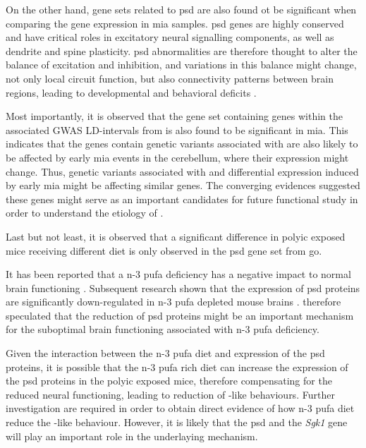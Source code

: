 On the other hand, gene sets related to \gls{psd} are also found ot be significant when comparing the gene expression in \gls{mia} samples. 
\gls{psd} genes are highly conserved and have critical roles in excitatory neural signalling components, as well as dendrite and spine plasticity.
\gls{psd} abnormalities are therefore thought to alter the balance of excitation and inhibition, and variations in this balance might change, not only local circuit function, but also connectivity patterns between brain regions, leading to developmental and behavioral deficits \citep{Cline2005}.

Most importantly, it is observed that the gene set containing genes within the associated \gls{GWAS} LD-intervals from \citet{Purcell2014} is also found to be significant in \gls{mia}.
This indicates that the genes contain genetic variants associated with  are also likely to be affected by early \gls{mia} events in the cerebellum, where their expression might change. 
Thus, genetic variants associated with  and differential expression induced by early \gls{mia} might be affecting similar genes.
The converging evidences suggested these genes might serve as an important candidates for future functional study in order to understand the etiology of .

Last but not least, it is observed that a significant difference in \gls{polyic} exposed mice receiving different diet is only observed in the \gls{psd} gene set from \gls{go}.

It has been reported that a n-3 \gls{pufa} deficiency has a negative impact to normal brain functioning \citep{Bazinet2014,Calon2005}.
Subsequent research shown that the expression of \gls{psd} proteins are significantly down-regulated in n-3 \gls{pufa} depleted mouse brains \citep{Sidhu2011}.
\citet{Sidhu2011} therefore speculated that the reduction of \gls{psd} proteins might be an important mechanism for the suboptimal brain functioning associated with n-3 \gls{pufa} deficiency.

Given the interaction between the n-3 \gls{pufa} diet and expression of the \gls{psd} proteins, it is possible that the n-3 \gls{pufa} rich diet can increase the expression of the \gls{psd} proteins in the \gls{polyic} exposed mice, therefore compensating for the reduced neural functioning, leading to reduction of -like behaviours. 
Further investigation are required in order to obtain direct evidence of how n-3 \gls{pufa} diet reduce the -like behaviour.
However, it is likely that the \gls{psd} and the \textit{Sgk1} gene will play an important role in the underlaying mechanism.


